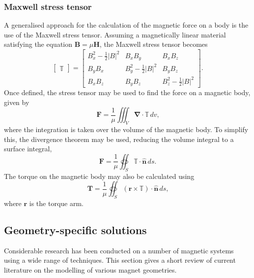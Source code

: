 \subsubsection{Maxwell stress tensor}
A generalised approach for the calculation of the magnetic force on a body is the use of the Maxwell stress tensor. Assuming a magnetically linear material satisfying the equation \(\mathbf{B} = \mu \mathbf{H}\), the Maxwell stress tensor becomes
\begin{equation}
    \begin{bmatrix} \mathbb{T} \end{bmatrix} = \begin{bmatrix} B_x^2-\frac{1}{2}\left|B\right|^2 & B_xB_y & B_xB_z \\
    B_yB_x & B_y^2-\frac{1}{2}\left|B\right|^2 & B_yB_z \\
    B_xB_z & B_yB_z & B_z^2-\frac{1}{2}\left|B\right|^2 \end{bmatrix} \text{.}
\end{equation}
Once defined, the stress tensor may be used to find the force on a magnetic body, given by
\begin{equation}
    \mathbf{F} = \frac{1}{\mu} \iiint_V \bm{\nabla} \cdot \mathbb{T}\, dv \text{,}
\end{equation}
where the integration is taken over the volume of the magnetic body. To simplify this, the divergence theorem may be used, reducing the volume integral to a surface integral,
\begin{equation}
    \mathbf{F} = \frac{1}{\mu} \oiint_S \mathbb{T} \cdot \hat{\mathbf{n}}\, ds \text{.}
\end{equation}
The torque on the magnetic body may also be calculated using
\begin{equation}
    \mathbf{T} = \frac{1}{\mu} \oiint_S \left( \mathbf{r} \times \mathbb{T} \right) \cdot \hat{\mathbf{n}}\, ds \text{,}
\end{equation}
where \(\mathbf{r}\) is the torque arm.

\subsection{Geometry-specific solutions}\label{sec:geometrySolutions}
Considerable research has been conducted on a number of magnetic systems using a wide range of techniques. This section gives a short review of current literature on the modelling of various magnet geometries.

